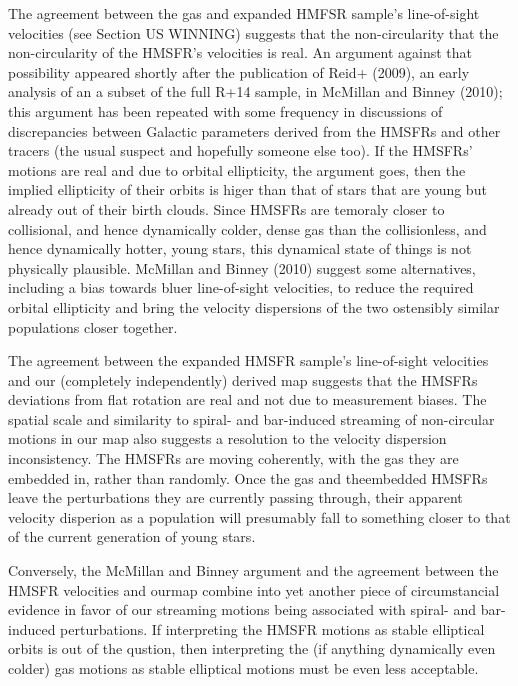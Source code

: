 The agreement between the gas and expanded HMFSR sample's line-of-sight velocities (see Section US WINNING) suggests that the non-circularity that the non-circularity of the HMSFR's velocities is real. 
An argument against that possibility appeared shortly after the publication of Reid+ (2009), an early analysis of an a subset of the full R+14 sample, in McMillan and Binney (2010); this argument has been repeated with some frequency in discussions of discrepancies between Galactic parameters derived from the HMSFRs and other tracers (the usual suspect and hopefully someone else too).
If the HMSFRs' motions are real and due to orbital ellipticity, the argument goes, then the implied ellipticity of their orbits is higer than that of stars that are young but already out of their birth clouds. 
Since HMSFRs are temoraly closer to collisional, and hence dynamically colder, dense gas than the collisionless, and hence dynamically hotter, young stars, this dynamical state of things is not physically plausible. 
McMillan and Binney (2010) suggest some alternatives, including a bias towards bluer line-of-sight velocities, to reduce the required orbital ellipticity and bring the velocity dispersions of the two ostensibly similar populations closer together.

The agreement between the expanded HMSFR sample's line-of-sight velocities and our (completely independently) derived map suggests that the HMSFRs deviations from flat rotation are real and not due to measurement biases.
The spatial scale and similarity to spiral- and bar-induced streaming of non-circular motions in our map also suggests a resolution to the velocity dispersion inconsistency. The HMSFRs are moving coherently, with the gas they are embedded in, rather than randomly. Once the gas and theembedded HMSFRs leave the perturbations they are currently passing through, their apparent velocity disperion as a population will presumably fall to something closer to that of the current generation of young stars.

Conversely, the McMillan and Binney argument and the agreement between the HMSFR velocities and ourmap combine into yet another piece of circumstancial evidence in favor of our streaming motions being associated with spiral- and bar-induced perturbations. 
If interpreting the HMSFR motions as stable elliptical orbits is out of the qustion, then interpreting the (if anything dynamically even colder) gas motions as stable elliptical motions must be even less acceptable.
